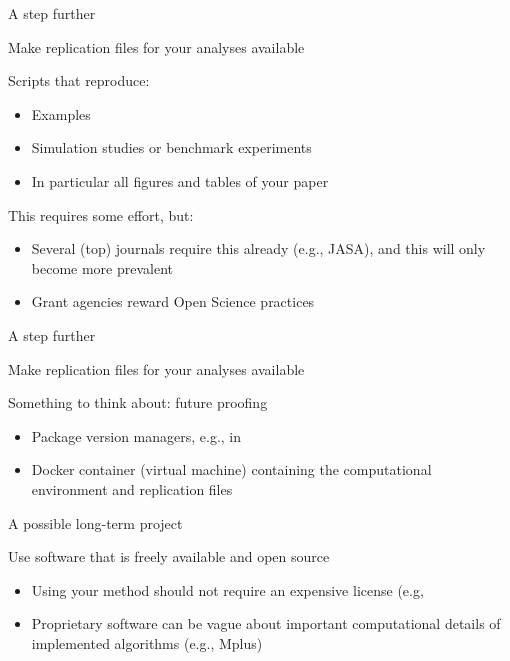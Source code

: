 \documentclass[pdfpagelabels=false, usepdftitle=false]{beamer}
\begin{document}
\begin{frame}[t]{A step further}
\begin{itemize}
  \arrowitem \alert{Make replication files for your analyses available}
\end{itemize}

\vfill

Scripts that reproduce:
\smallskip
\begin{itemize}
  \item Examples
  \smallskip
  \item Simulation studies or benchmark experiments
  \smallskip
  \item In particular all figures and tables of your paper
\end{itemize}

\vfill

\begin{itemize}
  \arrowitem This requires some effort, but:
  \smallskip
  \begin{itemize}
    \item Several (top) journals require this already (e.g., JASA), and this
    will only become more prevalent
    \smallskip
    \item Grant agencies reward Open Science practices
  \end{itemize}
\end{itemize}
\end{frame}


\begin{frame}[t]{A step further}
\begin{itemize}
  \arrowitem \alert{Make replication files for your analyses available}
\end{itemize}

\vfill

Something to think about: future proofing
\medskip
\begin{itemize}
  \item Package version managers, e.g.,  in 
  \smallskip
  \item Docker container (virtual machine) containing the computational
  environment and replication files
\end{itemize}
\end{frame}


\begin{frame}[t]{A possible long-term project}
\begin{itemize}
  \arrowitem \alert{Use software that is freely available and open source}
\end{itemize}

\vfill

\begin{itemize}
  \item Using your method should not require an expensive license (e.g,
  \bigskip
  \item Proprietary software can be vague about important computational details
  of implemented algorithms (e.g., Mplus)
\end{itemize}
\end{frame}
\end{document}
